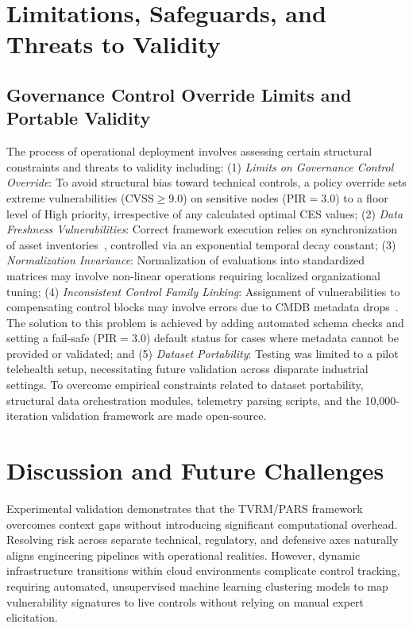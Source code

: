 \documentclass[conference,a4paper]{IEEEtran}
\begin{document}
\section{Limitations, Safeguards, and Threats to Validity}
\subsection{Governance Control Override Limits and Portable Validity}
The process of operational deployment involves assessing certain structural constraints and threats to validity including: (1) \textit{Limits on Governance Control Override}: To avoid structural bias toward technical controls, a policy override sets extreme vulnerabilities ($\text{CVSS} \ge 9.0$) on sensitive nodes ($\text{PIR}=3.0$) to a floor level of High priority, irrespective of any calculated optimal CES values; (2) \textit{Data Freshness Vulnerabilities}: Correct framework execution relies on synchronization of asset inventories~\cite{b1}, controlled via an exponential temporal decay constant; (3) \textit{Normalization Invariance}: Normalization of evaluations into standardized matrices may involve non-linear operations requiring localized organizational tuning; (4) \textit{Inconsistent Control Family Linking}: Assignment of vulnerabilities to compensating control blocks may involve errors due to CMDB metadata drops~\cite{b19}. The solution to this problem is achieved by adding automated schema checks and setting a fail-safe ($\text{PIR}=3.0$) default status for cases where metadata cannot be provided or validated; and (5) \textit{Dataset Portability}: Testing was limited to a pilot telehealth setup, necessitating future validation across disparate industrial settings. To overcome empirical constraints related to dataset portability, structural data orchestration modules, telemetry parsing scripts, and the 10,000-iteration validation framework are made open-source.
\vspace{-3pt}
\section{Discussion and Future Challenges}
Experimental validation demonstrates that the TVRM/PARS framework overcomes context gaps without introducing significant computational overhead. Resolving risk across separate technical, regulatory, and defensive axes naturally aligns engineering pipelines with operational realities. However, dynamic infrastructure transitions within cloud environments complicate control tracking, requiring automated, unsupervised machine learning clustering models to map vulnerability signatures to live controls without relying on manual expert elicitation.
\end{document}
